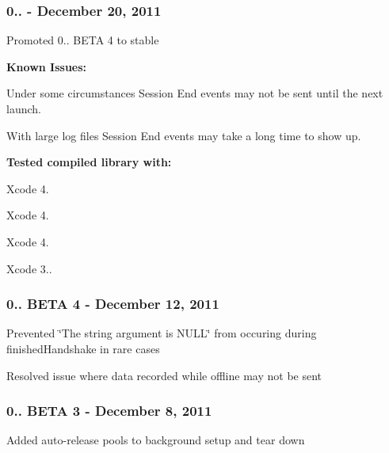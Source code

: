 \subsubsection*{0.. -\/ December 20, 2011}


\begin{DoxyItemize}
\item Promoted 0.. B\-E\-T\-A 4 to stable
\end{DoxyItemize}

{\bfseries Known Issues\-:}


\begin{DoxyItemize}
\item Under some circumstances Session End events may not be sent until the next launch.
\item With large log files Session End events may take a long time to show up.
\end{DoxyItemize}

{\bfseries Tested compiled library with\-:}


\begin{DoxyItemize}
\item Xcode 4.
\item Xcode 4.
\item Xcode 4.
\item Xcode 3..
\end{DoxyItemize}

\subsubsection*{0.. B\-E\-T\-A 4 -\/ December 12, 2011}


\begin{DoxyItemize}
\item Prevented \char`\"{}\-The string argument is N\-U\-L\-L\char`\"{} from occuring during finished\-Handshake in rare cases
\item Resolved issue where data recorded while offline may not be sent
\end{DoxyItemize}

\subsubsection*{0.. B\-E\-T\-A 3 -\/ December 8, 2011}


\begin{DoxyItemize}
\item Added auto-\/release pools to background setup and tear down
\end{DoxyItemize}


